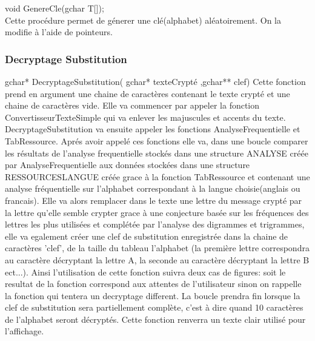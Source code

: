 \documentclass[a4]{article}
\begin{document}
	void GenereCle(gchar T[]);\\
		Cette procédure permet de génerer une clé(alphabet) aléatoirement. On la modifie à l'aide de pointeurs.
	
	\subsubsection{Decryptage Substitution}
gchar* DecryptageSubstitution( gchar* texteCrypté ,gchar** clef)
	Cette fonction prend en argument une chaine de caractères contenant le texte crypté et une chaine
	de caractères vide.
	Elle va commencer par appeler la fonction ConvertisseurTexteSimple qui va enlever les majuscules et accents du texte. 
	DecryptageSubstitution va ensuite appeler les fonctions AnalyseFrequentielle et TabRessource. 
	Aprés avoir appelé ces fonctions elle va, dans une boucle comparer les résultats de l'analyse frequentielle stockés 
	dans une structure ANALYSE créée par AnalyseFrequentielle aux données stockées dans une structure RESSOURCESLANGUE créée
	grace à la fonction TabRessource et contenant une analyse fréquentielle sur l'alphabet correspondant à la langue
	choisie(anglais ou francais).
	Elle va alors remplacer dans le texte une lettre du message crypté par la lettre qu'elle semble crypter grace à une 
	conjecture basée sur les fréquences des lettres les plus utilisées et complétée par l'analyse des digrammes et
	trigrammes, elle va egalement créer une clef de substitution enregistrée dans la chaine de caractères 'clef', de la taille du tableau
	l'alphabet (la première lettre correspondra au caractère décryptant la lettre A, la seconde au caractère décryptant la 
	lettre B ect...).
	Ainsi l'utilisation de cette fonction suivra deux cas de figures: soit le resultat de la fonction 
	correspond aux attentes de l'utilisateur sinon on rappelle la fonction qui tentera un decryptage different. 
	La boucle prendra fin lorsque la clef de substitution sera partiellement complète, c'est à dire quand 10 caractères
	de l'alphabet seront décryptés.
	Cette fonction renverra un texte clair utilisé pour l'affichage.
	
\end{document}
